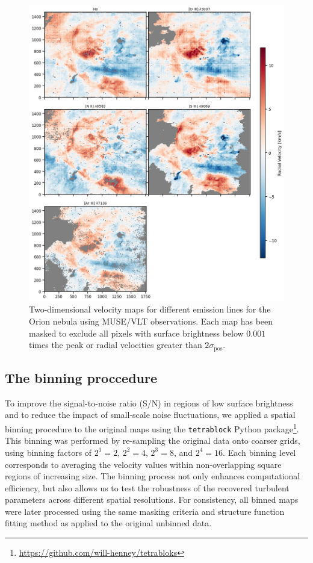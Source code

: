 \documentclass[fleqn,usenatbib, useAMS, a4paper]{mnras}
\begin{document}
\begin{figure}
 \centering
 \includegraphics[width=6in]{figures/velocity_maps_shared_cbar_fixed}\par
 \caption{
 Two-dimensional velocity maps for different emission lines for the Orion nebula using MUSE/VLT observations. Each map has been masked to exclude all pixels with surface brightness below \(0.001\) times the peak or radial velocities greater than \(2\sigma_\text{pos}\). 
 }
\label{fig:figures/velocity_maps_shared_cbar_fixed.png}
\end{figure}

\subsection{The binning proccedure}

To improve the signal-to-noise ratio (S/N) in regions of low surface brightness and to reduce the impact of small-scale noise fluctuations, we applied a spatial binning procedure to the original maps using the \texttt{tetrablock} Python package\footnote{\url{https://github.com/will-henney/tetrabloks}}.
This binning was performed by re-sampling the original data onto coarser grids, using binning factors of $2^1 = 2$, $2^2 = 4$, $2^3 = 8$, and $2^4 = 16$. 
Each binning level corresponds to averaging the velocity values within non-overlapping square regions of increasing size. 
The binning process not only enhances computational efficiency, but also allows us to test the robustness of the recovered turbulent parameters across different spatial resolutions. For consistency, all binned maps were later processed using the same masking criteria and structure function fitting method as applied to the original unbinned data.
\end{document}
